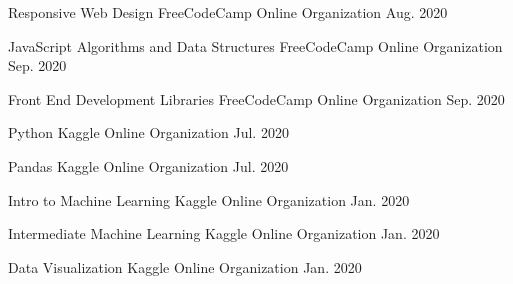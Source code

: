 

\begin{cvhonors}

  \cvhonor
    {Responsive Web Design} %
    {FreeCodeCamp} %
    {Online Organization} %
    {Aug. 2020} %

  \cvhonor
    {JavaScript Algorithms and Data Structures} %
    {FreeCodeCamp} %
    {Online Organization} %
    {Sep. 2020} %

  \cvhonor
    {Front End Development Libraries} %
    {FreeCodeCamp} %
    {Online Organization} %
    {Sep. 2020} %

  \cvhonor
    {Python} %
    {Kaggle} %
    {Online Organization} %
    {Jul. 2020} %

  \cvhonor
    {Pandas} %
    {Kaggle} %
    {Online Organization} %
    {Jul. 2020} %

  \cvhonor
    {Intro to Machine Learning} %
    {Kaggle} %
    {Online Organization} %
    {Jan. 2020} %

  \cvhonor
    {Intermediate Machine Learning} %
    {Kaggle} %
    {Online Organization} %
    {Jan. 2020} %

  \cvhonor
    {Data Visualization} %
    {Kaggle} %
    {Online Organization} %
    {Jan. 2020} %

\end{cvhonors}
